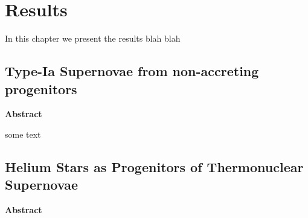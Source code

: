 \documentclass[../../main/thesis_msc.tex]{subfiles}
\begin{document}
	\chapter{Results}
	
	
	In this chapter we present the results blah blah
	
	\newpage
	
	\section{Type-Ia Supernovae from non-accreting progenitors}
	
	
		\vspace{3cm}
		
		 \begin{center}
			\textbf{Abstract}
		\end{center}	
		
		some text
		
		\newpage
	
		
            
           
            
            
            
     \section{Helium Stars as Progenitors of Thermonuclear Supernovae}
     
     
    	 \vspace{3cm}
    	 \begin{center}
			\textbf{Abstract}
		\end{center}
		
		
	
\end{document}
